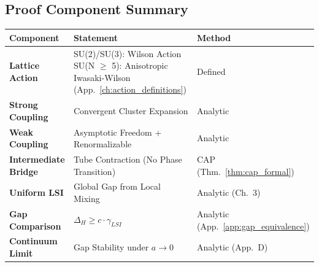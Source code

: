 \subsection{Proof Component Summary}
\begin{longtable}{|p{}|p{}|p{}|}
\hline
\textbf{Component} & \textbf{Statement} & \textbf{Method} \\ \hline
\textbf{Lattice Action} & SU(2)/SU(3): Wilson Action \newline SU(N $\ge$ 5): Anisotropic Iwasaki-Wilson (App.~\ref{ch:action_definitions}) & Defined \\ \hline
\textbf{Strong Coupling} & Convergent Cluster Expansion & Analytic \\ \hline
\textbf{Weak Coupling} & Asymptotic Freedom + Renormalizable & Analytic \\ \hline
\textbf{Intermediate Bridge} & Tube Contraction (No Phase Transition) & CAP (Thm.~\ref{thm:cap_formal}) \\ \hline
\textbf{Uniform LSI} & Global Gap from Local Mixing & Analytic (Ch.~3) \\ \hline
\textbf{Gap Comparison} & $\Delta_H \ge c \cdot \gamma_{LSI}$ & Analytic (App.~\ref{app:gap_equivalence}) \\ \hline
\textbf{Continuum Limit} & Gap Stability under $a \to 0$ & Analytic (App.~D) \\ \hline
\end{longtable}
